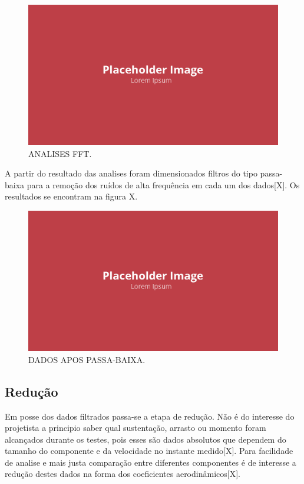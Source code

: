 \begin{figure}[!ht]
    \centering
    \includegraphics[width=.8\linewidth]{figuras/placeholder.png}
    \caption{ANALISES FFT\cite{autor}.}
    \label{fig:placeholder}
\end{figure}

A partir do resultado das analises foram dimensionados filtros do tipo passa-baixa para a remoção dos ruídos de alta frequência em cada um dos dados[X]. Os resultados se encontram na figura X.

\begin{figure}[!ht]
    \centering
    \includegraphics[width=.8\linewidth]{figuras/placeholder.png}
    \caption{DADOS APOS PASSA-BAIXA\cite{autor}.}
    \label{fig:placeholder}
\end{figure}

\subsection{Redução}

Em posse dos dados filtrados passa-se a etapa de redução. Não é do interesse do projetista a principio saber qual sustentação, arrasto ou momento foram alcançados durante os testes, pois esses são dados absolutos que dependem do tamanho do componente e da velocidade no instante medido[X]. Para facilidade de analise e mais justa comparação entre diferentes componentes é de interesse a redução destes dados na forma dos coeficientes aerodinâmicos[X].

